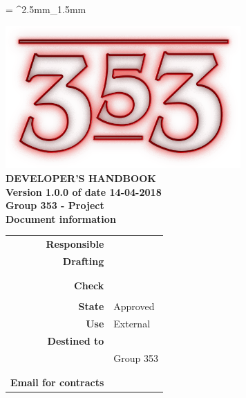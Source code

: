 \documentclass[openany, a4paper, 12pt]{report}
\begin{document}
	
	\tabulinesep = ^2.5mm_1.5mm
	
	\begin{titlepage}
		\centering
		\vfill
		{
			\bfseries
			\vskip2cm
			\includegraphics[width=9cm]{../../common/images/logo.png} \\
			\vfill
			\Huge{DEVELOPER'S HANDBOOK}\\
			\vfill
			\Large Version 1.0.0 of date 14-04-2018\\ 
			\large Group 353 - Project \progetto \\
			\vfill
			\normalsize Document information\\
			\begin{table}[htbp]
				\centering
				\renewcommand\arraystretch{1.2}
				\begin{tabular}{r|l}
					\hline
					\textbf{Responsible}	& \Parwinder \\
					
					\textbf{Drafting} 		& \Elena \\
											& \Gianluca \\
											& \Valentina \\
											
					\textbf{Check} 			& \Riccardo \\	
											& \Davide \\
											
					\textbf{State} 			& Approved\\
					\textbf{Use}			& External\\
					\textbf{Destined to}   	& \Proponente\\
										& Group 353\\
										& \Vardanega\\
										& \Cardin\\
					
					\textbf{Email for contracts}	& \mailgroup
				\end{tabular}
			\end{table}
			\vfill
		}    
	\end{titlepage}
	
	\renewcommand{\contentsname}{Index}
	\tableofcontents
	\renewcommand{\listtablename}{List of Tables}
	\listoftables
	\renewcommand{\listfigurename}{List of Figures}
	\listoffigures
	\newpage
	
	
	
	
	
	
	
	
	
	
\end{document}
